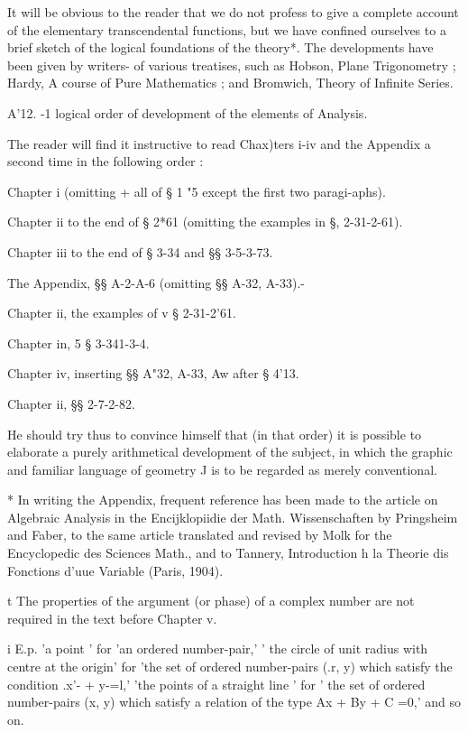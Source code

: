 It will be obvious to the reader that we do not profess to give a complete account of 
the elementary transcendental functions, but we have confined ourselves to a brief sketch 
of the logical foundations of the theory*. The developments have been given by writers- 
of various treatises, such as Hobson, Plane Trigonometry ; Hardy, A course of Pure 
Mathematics ; and Bromwich, Theory of Infinite Series. 

A'12. -1 logical order of development of the elements of Analysis. 

The reader will find it instructive to read Chax)ters i-iv and the Appendix a second 
time in the following order : 

Chapter i (omitting + all of § 1 "5 except the first two paragi-aphs). 

Chapter ii to the end of § 2*61 (omitting the examples in §,  2-31-2-61). 

Chapter iii to the end of § 3-34 and §§ 3-5-3-73. 

The Appendix, §§ A-2-A-6 (omitting §§ A-32, A-33).- 

Chapter ii, the examples of v § 2-31-2'61. 

Chapter in, 5 § 3-341-3-4. 

Chapter iv, inserting §§ A"32, A-33, Aw after § 4'13. 

Chapter ii, §§ 2-7-2-82. 

He should try thus to convince himself that (in that order) it is possible to elaborate 
a purely arithmetical development of the subject, in which the graphic and familiar 
language of geometry J is to be regarded as merely conventional. 

* In writing the Appendix, frequent reference has been made to the article on Algebraic 
Analysis in the Encijklopiidie der Math. Wissenschaften by Pringsheim and Faber, to the same 
article translated and revised by Molk for the Encyclopedic des Sciences Math., and to Tannery, 
Introduction h la Theorie dis Fonctions d'uue Variable (Paris, 1904). 

t The properties of the argument (or phase) of a complex number are not required in the 
text before Chapter v. 

i E.p. 'a point ' for 'an ordered number-pair,' ' the circle of unit radius with centre at the 
origin' for 'the set of ordered number-pairs (.r, y) which satisfy the condition .x'- + y-=l,' 'the 
points of a straight line ' for ' the set of ordered number-pairs (x, y) which satisfy a relation of 
the type Ax + By + C =0,' and so on. 



